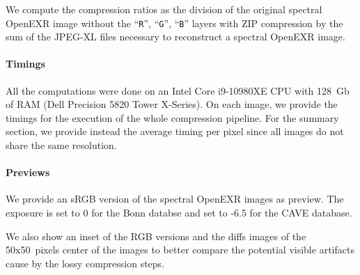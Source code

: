 We compute the compression ratios as the division of the original spectral OpenEXR image without the ``\verb?R?'', ``\verb?G?'', ``\verb?B?'' layers with ZIP compression by the sum of the JPEG-XL files necessary to reconstruct a spectral OpenEXR image.


\paragraph{Timings}

All the computations were done on an Intel Core i9-10980XE CPU with 128~Gb of RAM (Dell Precision 5820 Tower X-Series). On each image, we provide the timings for the execution of the whole compression pipeline. For the summary section, we provide  instead the average timing per pixel since all images do not share the same resolution.


\paragraph{Previews}

We provide an sRGB version of the spectral OpenEXR images as preview. The exposure is set to 0 for the Bonn databse and set to -6.5 for the CAVE database.

We also show an inset of the RGB versions and the diffs images of the 50x50~pixels center of the images to better compare the potential visible artifacts cause by the lossy compression steps.

\clearpage
